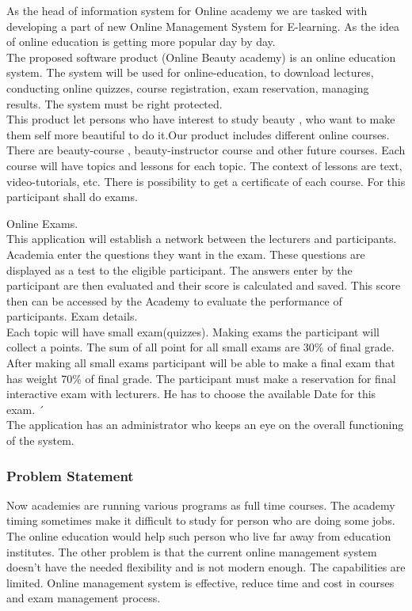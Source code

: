 \documentclass{scrartcl}
\begin{document}
As the head of information system for Online academy we are tasked with developing a part of new Online Management System for E-learning. As the idea of online education is getting more popular day by day. \\
The proposed software product (Online Beauty academy) is an online education system. The system will be used for online-education, to download lectures, conducting online quizzes, course registration, exam reservation, managing results. The system must be right protected.\\
This product let persons who have interest to study beauty , who want to make them self more beautiful to do it.Our product includes different online courses. There are  beauty-course , beauty-instructor course and other future courses.
 Each course will have topics and lessons for each topic. The context of lessons are text, video-tutorials, etc. 
 There is possibility to get a certificate of each course.
 For this participant  shall do exams. 

Online Exams.\\
 This application will establish a network between the lecturers and participants. Academia enter the questions they want in the exam. These questions are displayed as a test to the eligible participant. The answers enter by the participant are then evaluated and their score is calculated and saved. This score then can be accessed by the Academy to evaluate the performance of participants.
Exam details.\\
Each topic will have small exam(quizzes). Making exams the participant will collect a points. The sum of all point for all small exams are 30\% of final grade. After making all small exams participant will be able to make a final exam that has weight 70\% of final grade. The participant must make a reservation for final interactive exam with lecturers. He has to choose the available Date for this exam. ´\\

The application has an administrator who keeps an eye on the overall functioning of the system.

  	
  	\subsubsection{Problem Statement}
  	Now academies are running various programs as full time courses. The academy timing sometimes make it difficult to study for person who are doing some jobs. The online education would help such person who live far away from education institutes.
The other problem is that the current online management system doesn't have the needed flexibility and is not modern enough. The capabilities are limited.
Online management system is effective, reduce time and cost in courses and exam management process.
\end{document}
